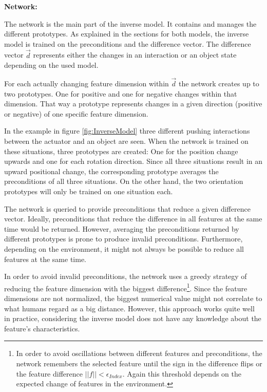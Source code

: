 \textbf{Network:}

The network is the main part of the inverse model. It contains and manages the different prototypes. 
As explained in the sections for both models, the inverse model is trained on the preconditions and the difference vector. The difference vector $\vec{d}$ represents either the changes in an interaction or an object state depending on the used model.

For each actually changing feature dimension within $\vec{d}$ the network creates up to two prototypes. One for positive and one for negative changes within that dimension. That way a prototype represents changes in a given direction (positive or negative) of one specific feature dimension. 

In the example in figure \ref{fig:InverseModel} three different pushing interactions between the actuator and an object are seen. 
When the network is trained on these situations, three prototypes are created: One for the position change upwards and one for each rotation direction. 
Since all three situations result in an upward positional change, the corresponding prototype averages the preconditions of all three situations.
On the other hand, the two orientation prototypes will only be trained on one situation each.

The network is queried to provide preconditions that reduce a given difference vector. Ideally, preconditions that reduce the difference in all features at the same time would be returned. 
However, averaging the preconditions returned by different prototypes is prone to produce invalid preconditions. 
Furthermore, depending on the environment, it might not always be possible to reduce all features at the same time. 

In order to avoid invalid preconditions, the network uses a greedy strategy of reducing the feature dimension with the biggest difference\footnote{In order to avoid oscillations between different features and preconditions, the network remembers the selected feature until the sign in the difference flips or the feature difference $||f|| < \epsilon_{Index}$. Again this threshold depends on the expected change of features in the environment.}. Since the feature dimensions are not normalized, the biggest numerical value might not correlate to what humans regard as a big distance. 
However, this approach works quite well in practice, considering the inverse model does not have any knowledge about the feature's characteristics. 


